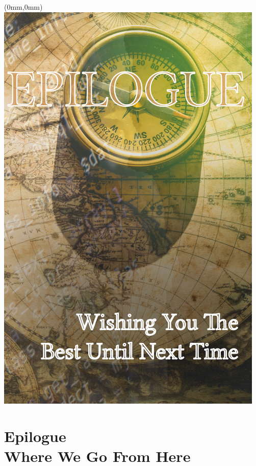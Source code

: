\documentclass[10pt,openany,final]{memoir}
\begin{document}
\chapter*{}
\begin{textblock*}{70.9mm}(0mm,0mm)
\includegraphics[width=\paperwidth]{./media/images/epilogue}
\end{textblock*}

\chapter{Epilogue\\ \small{Where We Go From Here}}
\label{ch:epilogue}


%



\end{document}

